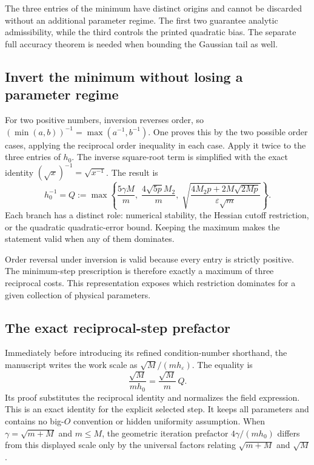 \documentclass[11pt,a4paper]{report}
\begin{document}
The three entries of the minimum have distinct origins and cannot be discarded without an additional parameter regime. The first two guarantee analytic admissibility, while the third controls the printed quadratic bias. The separate full accuracy theorem is needed when bounding the Gaussian tail as well.

\subsection{\texorpdfstring{Invert the minimum without losing a parameter regime}{Invert the minimum without losing a parameter regime}}
\label{report-step-KineticLangevin-SecondOrderComplexity-lean-2}


For two positive numbers, inversion reverses order, so \((\min(a,b))^{-1}=\max(a^{-1},b^{-1})\). One proves this by the two possible order cases, applying the reciprocal order inequality in each case. Apply it twice to the three entries of \(h_0\). The inverse square-root term is simplified with the exact identity \((\sqrt x)^{-1}=\sqrt{x^{-1}}\). The result is \[h_0^{-1}=Q:=\max\!\left\{\frac{5\gamma M}{m},\;\frac{4\sqrt{5p}M_2}{m},\;\sqrt{\frac{4M_2p+2M\sqrt{2Mp}}{\varepsilon\sqrt m}}\right\}.\] Each branch has a distinct role: numerical stability, the Hessian cutoff restriction, or the quadratic quadratic-error bound. Keeping the maximum makes the statement valid when any of them dominates.



Order reversal under inversion is valid because every entry is strictly positive. The minimum-step prescription is therefore exactly a maximum of three reciprocal costs. This representation exposes which restriction dominates for a given collection of physical parameters.

\subsection{\texorpdfstring{The exact reciprocal-step prefactor}{The exact reciprocal-step prefactor}}
\label{report-step-KineticLangevin-SecondOrderComplexity-lean-3}


Immediately before introducing its refined condition-number shorthand, the manuscript writes the work scale as \(\sqrt M/(m h_\varepsilon)\). The equality is \[\frac{\sqrt M}{m h_0}=\frac{\sqrt M}{m}\,Q.\] Its proof substitutes the reciprocal identity and normalizes the field expression. This is an exact identity for the explicit selected step. It keeps all parameters and contains no big-\(O\) convention or hidden uniformity assumption. When \(\gamma=\sqrt{m+M}\) and \(m\le M\), the geometric iteration prefactor \(4\gamma/(m h_0)\) differs from this displayed scale only by the universal factors relating \(\sqrt{m+M}\) and \(\sqrt M\).
\end{document}
